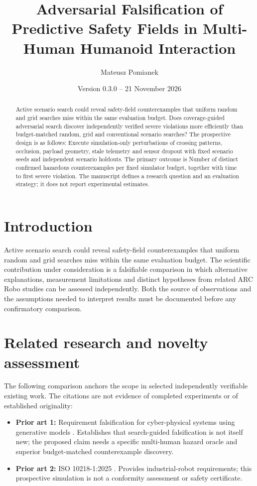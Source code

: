 \documentclass[11pt,a4paper]{article}
\title{Adversarial Falsification of Predictive Safety Fields in Multi-Human Humanoid Interaction}
\author{Mateusz Pomianek}
\date{Version 0.3.0 -- 21 November 2026}
\begin{document}
\maketitle

\begin{abstract}
Active scenario search could reveal safety-field counterexamples that uniform random and grid searches miss within the same evaluation budget. Does coverage-guided adversarial search discover independently verified severe violations more efficiently than budget-matched random, grid and conventional scenario searches? The prospective design is as follows: Execute simulation-only perturbations of crossing patterns, occlusion, payload geometry, stale telemetry and sensor dropout with fixed scenario seeds and independent scenario holdouts. The primary outcome is Number of distinct confirmed hazardous counterexamples per fixed simulator budget, together with time to first severe violation. The manuscript defines a research question and an evaluation strategy; it does not report experimental estimates.
\end{abstract}

\section{Introduction}
Active scenario search could reveal safety-field counterexamples that uniform random and grid searches miss within the same evaluation budget. The scientific contribution under consideration is a falsifiable comparison in which alternative explanations, measurement limitations and distinct hypotheses from related ARC Robo studies can be assessed independently. Both the source of observations and the assumptions needed to interpret results must be documented before any confirmatory comparison.

\section{Related research and novelty assessment}
The following comparison anchors the scope in selected independently verifiable existing work. The citations are not evidence of completed experiments or of established originality:
\begin{itemize}
\item \textbf{Prior art 1:} Requirement falsification for cyber-physical systems using generative models \cite{source1}. Establishes that search-guided falsification is not itself new; the proposed claim needs a specific multi-human hazard oracle and superior budget-matched counterexample discovery.
\item \textbf{Prior art 2:} ISO 10218-1:2025 \cite{source2}. Provides industrial-robot requirements; this prospective simulation is not a conformity assessment or safety certificate.
\end{itemize}
\end{document}
